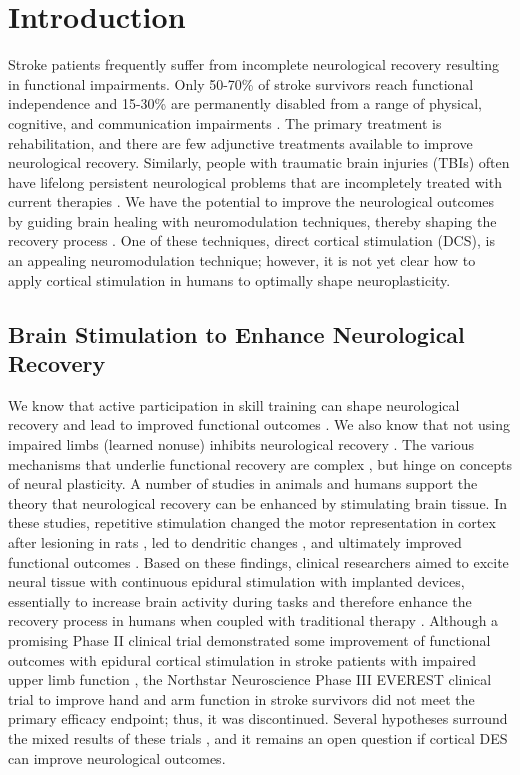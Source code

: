 \section{Introduction}

Stroke patients frequently suffer from incomplete neurological recovery resulting in functional impairments. Only 50-70\% of stroke survivors reach functional independence and 15-30\% are permanently disabled from a range of physical, cognitive, and communication impairments \cite{Lloyd-Jones2010}. The primary treatment is rehabilitation, and there are few adjunctive treatments available to improve neurological recovery. Similarly, people with traumatic brain injuries (TBIs) often have lifelong persistent neurological problems that are incompletely treated with current therapies \cite{Corrigan2014}. We have the potential to improve the neurological outcomes by guiding brain healing with neuromodulation techniques, thereby shaping the recovery process \cite{Edwardson2013}. One of these techniques, direct cortical stimulation (DCS), is an appealing neuromodulation technique; however, it is not yet clear how to apply cortical stimulation in humans to optimally shape neuroplasticity. 

\subsection{Brain Stimulation to Enhance Neurological Recovery}
We know that active participation in skill training can shape neurological recovery and lead to improved functional outcomes \cite{Wolf2006}. We also know that not using impaired limbs (learned nonuse) inhibits neurological recovery \cite{Elbert1997}. The various mechanisms that underlie functional recovery are complex \cite{Warraich2010}, but hinge on concepts of neural plasticity. A number of studies in animals and humans support the theory that neurological recovery can be enhanced by stimulating brain tissue. In these studies, repetitive stimulation changed the motor representation in cortex after lesioning in rats \cite{Nudo1990}, led to dendritic changes \cite{Adkins-Muir2003}, and ultimately improved functional outcomes \cite{Adkins2008,Adkins2006a}. Based on these findings, clinical researchers aimed to excite neural tissue with continuous epidural stimulation with implanted devices, essentially to increase brain activity during tasks and therefore enhance the recovery process in humans when coupled with traditional therapy \cite{Harvey2009}. Although a promising Phase II clinical trial demonstrated some improvement of functional outcomes with epidural cortical stimulation in stroke patients with impaired upper limb function \cite{Huang2008a}, the Northstar Neuroscience Phase III EVEREST clinical trial to improve hand and arm function in stroke survivors did not meet the primary efficacy endpoint; thus, it was discontinued. Several hypotheses surround the mixed results of these trials \cite{Plow2009,Levy2016a}, and it remains an open question if cortical DES can improve neurological outcomes.

